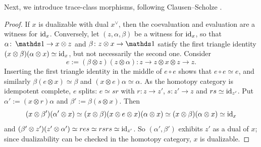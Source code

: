 	Next, we introduce trace-class morphisms, following Clausen--Scholze \cite{Scholze_Analytic_Geometry}.


	\begin{proof}
		If $x$ is dualizable with dual $x^{\vee}$, then the coevaluation and evaluation are a witness for $\operatorname{id}_x$. Conversely, let $(z,\alpha,\beta)$ be a witness for $\operatorname{id}_x$, so that $\alpha\colon \unit \to x \otimes z$ and $\beta\colon z \otimes x \to \unit$ satisfy the first triangle identity $(x \otimes \beta)(\alpha \otimes x) \simeq \operatorname{id}_x$, but not necessarily the second one. Consider
		\[
			e := (\beta \otimes z)(z \otimes \alpha)\colon z \to z \otimes x \otimes z \to z.
		\]
		Inserting the first triangle identity in the middle of $e \circ e$ shows that $e \circ e \simeq e$, and similarly $\beta(e \otimes x) \simeq \beta$ and $(x \otimes e)\alpha \simeq \alpha$. As the homotopy category is idempotent complete, $e$ splits: $e \simeq sr$ with $r\colon z \to z'$, $s\colon z' \to z$ and $rs \simeq \operatorname{id}_{z'}$. Put $\alpha' := (x \otimes r)\alpha$ and $\beta' := \beta(s \otimes x)$. Then
		\[
			(x \otimes \beta')(\alpha' \otimes x) \simeq (x \otimes \beta)(x \otimes e \otimes x)(\alpha \otimes x) \simeq (x \otimes \beta)(\alpha \otimes x) \simeq \operatorname{id}_x
		\]
		and $(\beta' \otimes z')(z' \otimes \alpha') \simeq r e s \simeq rsrs \simeq \operatorname{id}_{z'}$. So $(\alpha',\beta')$ exhibits $z'$ as a dual of $x$; since dualizability can be checked in the homotopy category, $x$ is dualizable.
	\end{proof}

